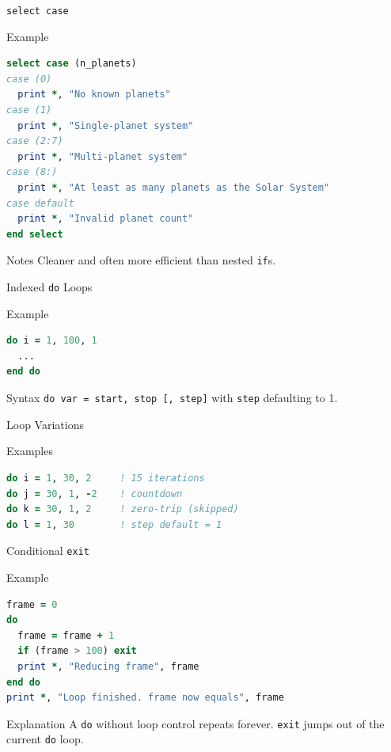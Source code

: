 \begin{frame}[fragile]{\texttt{select case}}
  \begin{block}{Example}
\begin{lstlisting}[language=Fortran]
select case (n_planets)
case (0)
  print *, "No known planets"
case (1)
  print *, "Single-planet system"
case (2:7)
  print *, "Multi-planet system"
case (8:)
  print *, "At least as many planets as the Solar System"
case default
  print *, "Invalid planet count"
end select
\end{lstlisting}
  \end{block}
  \begin{block}{Notes}
    Cleaner and often more efficient than nested \texttt{if}s.
  \end{block}
\end{frame}

\begin{frame}[fragile]{Indexed \texttt{do} Loops}
  \begin{block}{Example}
\begin{lstlisting}[language=Fortran]
do i = 1, 100, 1
  ...
end do
\end{lstlisting}
  \end{block}
  \begin{block}{Syntax}
    \texttt{do var = start, stop [, step]} with \texttt{step} defaulting to 1.
  \end{block}
\end{frame}

\begin{frame}[fragile]{Loop Variations}
  \begin{block}{Examples}
\begin{lstlisting}[language=Fortran]
do i = 1, 30, 2     ! 15 iterations
do j = 30, 1, -2    ! countdown
do k = 30, 1, 2     ! zero-trip (skipped)
do l = 1, 30        ! step default = 1
\end{lstlisting}
  \end{block}
\end{frame}

\begin{frame}[fragile]{Conditional \texttt{exit}}
  \begin{block}{Example}
\begin{lstlisting}[language=Fortran]
frame = 0
do
  frame = frame + 1
  if (frame > 100) exit
  print *, "Reducing frame", frame
end do
print *, "Loop finished. frame now equals", frame
\end{lstlisting}
  \end{block}
  \begin{block}{Explanation}
    A \texttt{do} without loop control repeats forever. \texttt{exit} jumps out of the current \texttt{do} loop.
  \end{block}
\end{frame}


